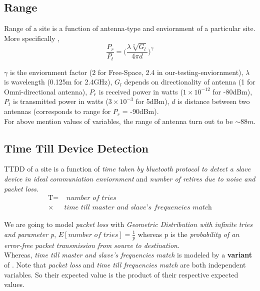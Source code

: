 \documentclass[10pt,twocolumn,letterpaper]{article}
\begin{document}
\subsection{Range}
Range of a site is a function of antenna-type and enviornment of a particular site. More specifically \cite{Andrea05},
\begin{equation}
   \frac{P_r}{P_t} = \bigg( \frac{\lambda \sqrt[2]{G_l}}{4\pi d} \bigg)^\gamma
\end{equation}

$\gamma$ is the enviornment factor (2 for Free-Space\cite{Andrea05}, 2.4 in our-testing-enviornment), $\lambda$ is wavelength (0.125m for 2.4GHz), $G_l$ depends on directionality of antenna (1 for Omni-directional antenna\cite{Andrea05}), $P_r$ is received power in watts ($1 \times 10^{-12}$ for -80dBm), $P_t$ is transmitted power in watts ($3 \times 10^{-3}$ for 5dBm), $d$ is distance between two antennas (corresponds to range for $P_r$ = -90dBm).\\
For above mention values of variables, the range of antenna turn out to be $\sim88m.$

\subsection{Time Till Device Detection}
TTDD of a site is a function of \textit{time taken by bluetooth protocol to detect a slave device in ideal communiation enviornment} and \textit{number of retires due to noise and packet loss}.
\begin{equation}
\begin{split}
   \text{T} = &\textit{ number of tries} \\ \times &\textit{time till master and slave's frequencies match}
\end{split}
\end{equation}

We are going to model \textit{packet loss} with \textit{Geometric Distribution with infinite tries and parameter p},
\( E[\textit{number of tries}] = \frac{1}{p} \) whereas p is the \textit{probability of an error-free packet transmission from source to destination}.\\
Whereas, \textit{time till master and slave's frequencies match} is modeled by a \textbf{variant} of \cite{chakraborty2010}. Note that \textit{packet loss} and \textit{time till frequencies match} are both independent variables. So their expected value is the product of their respective expected values.
\end{document}
